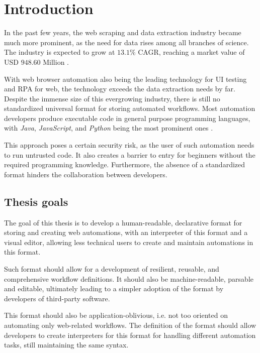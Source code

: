 \chapter*{Introduction} \label{intro}


In the past few years, the web scraping and data extraction industry became much more prominent, as the need for data rises among all branches of science. 
The industry is expected to grow at $13.1\%$ CAGR, reaching a market value of USD $948.60$ Million .
\par
With web browser automation also being the leading technology for UI testing and \ac{RPA} for web, the technology exceeds the data extraction needs by far.
Despite the immense size of this evergrowing industry, there is still no standardized universal format for storing automated workflows. 
Most automation developers produce executable code in general purpose programming languages, with \textit{Java}, \textit{JavaScript}, and \textit{Python} being the most prominent ones .
\par
This approach poses a certain security risk, as the user of such automation needs to run untrusted code. 
It also creates a barrier to entry for beginners without the required programming knowledge. 
Furthermore, the absence of a standardized format hinders the collaboration between developers.

\section*{Thesis goals}
The goal of this thesis is to develop a human-readable, declarative format for storing and creating web automations, with an interpreter of this format and a visual editor, allowing less technical users to create and maintain automations in this format.
\par
Such format should allow for a development of resilient, reusable, and comprehensive workflow definitions. 
It should also be machine-readable, parsable and editable, ultimately leading to a simpler adoption of the format by developers of third-party software.
\par
This format should also be application-oblivious, i.e. not too oriented on automating only web-related workflows.
The definition of the format should allow developers to create interpreters for this format for handling different automation tasks, still maintaining the same syntax.


